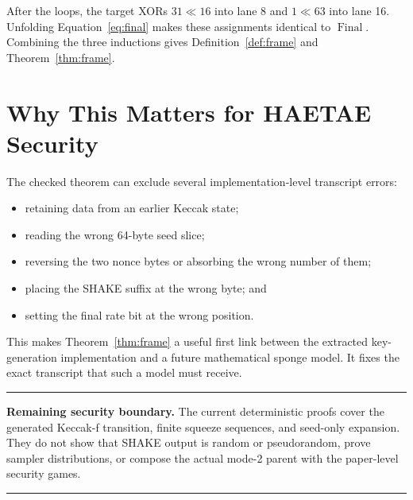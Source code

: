 \documentclass[11pt]{article}
\theoremstyle{definition}
\theoremstyle{plain}
\theoremstyle{remark}
\newcommand{\Final}{\operatorname{Final}}
\newenvironment{boundarybox}
  {\begin{center}\begin{minipage}{0.94\linewidth}\color{artifactred}\hrule\vspace{0.6em}\color{black}}
  {\vspace{0.6em}\color{artifactred}\hrule\end{minipage}\end{center}}
\begin{document}
After the loops, the target XORs $31\ll16$ into lane 8 and $1\ll63$ into lane
16.  Unfolding Equation~\eqref{eq:final} makes these assignments identical to
$\Final$.  Combining the three inductions gives Definition~\ref{def:frame} and
Theorem~\ref{thm:frame}.

\section{Why This Matters for HAETAE Security}

The checked theorem can exclude several implementation-level transcript
errors:
\begin{itemize}
\item retaining data from an earlier Keccak state;
\item reading the wrong 64-byte seed slice;
\item reversing the two nonce bytes or absorbing the wrong number of them;
\item placing the SHAKE suffix at the wrong byte; and
\item setting the final rate bit at the wrong position.
\end{itemize}

This makes Theorem~\ref{thm:frame} a useful first link between the extracted
key-generation implementation and a future mathematical sponge model.  It
fixes the exact transcript that such a model must receive.

\begin{boundarybox}
\textbf{Remaining security boundary.}
The current deterministic proofs cover the generated Keccak-f transition,
finite squeeze sequences, and seed-only expansion.  They do not show that
SHAKE output is random or pseudorandom, prove sampler distributions, or
compose the actual mode-2 parent with the paper-level security games.
\end{boundarybox}
\end{document}

